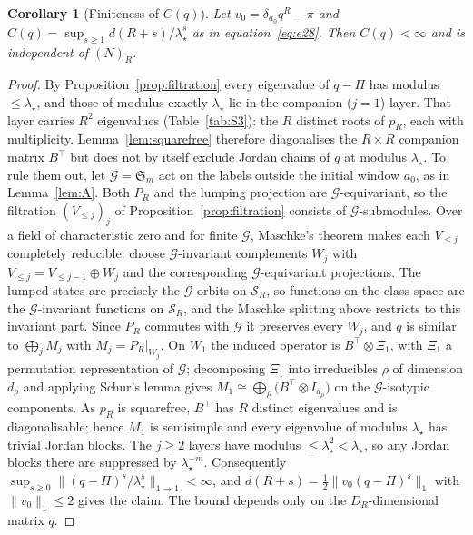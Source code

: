 \documentclass[twoside,11pt]{article}
\newtheorem{scor}[slemma]{Corollary}
\begin{document}
\begin{scor}[Finiteness of $C(q)$]\label{cor:Cfinite}
Let $v_0=\delta_{a_0}q^{R}-\pi$ and
$C(q)=\sup_{s\ge1}d(R+s)/\lambda_\star^{s}$ as in equation~\eqref{eq:e28}.
Then $C(q)<\infty$ and is independent of $(N)_R$.
\end{scor}

\begin{proof}
By Proposition~\ref{prop:filtration} every eigenvalue of $q-\Pi$ has modulus
$\le\lambda_\star$, and those of modulus exactly $\lambda_\star$ lie in the companion
($j=1$) layer. That layer carries $R^2$ eigenvalues (Table~\ref{tab:S3}):
the $R$ distinct roots of $p_R$, each with multiplicity. Lemma~\ref{lem:squarefree}
therefore diagonalises the $R\times R$ companion matrix $B^\top$ but does not
by itself exclude Jordan chains of $q$ at modulus $\lambda_\star$. To rule them out,
let $\mathcal{G}=\mathfrak{S}_{m}$ act on the labels outside the initial window $a_0$, as in Lemma~\ref{lem:A}. Both $P_R$ and
the lumping projection are $\mathcal{G}$-equivariant, so the filtration $(V_{\le j})_j$
of Proposition~\ref{prop:filtration} consists of $\mathcal{G}$-submodules. Over a field
of characteristic zero and for finite $\mathcal{G}$, Maschke's theorem makes each
$V_{\le j}$ completely reducible: choose $\mathcal{G}$-invariant complements $W_j$ with
$V_{\le j}=V_{\le j-1}\oplus W_j$ and the corresponding $\mathcal{G}$-equivariant
projections. The lumped states are precisely the $\mathcal{G}$-orbits on $\mathcal{S}_R$,
so functions on the class space are the $\mathcal{G}$-invariant functions on
$\mathcal{S}_R$, and the Maschke splitting above restricts to this invariant
part. Since $P_R$ commutes with $\mathcal{G}$ it preserves every $W_j$, and $q$
is similar to $\bigoplus_j M_j$ with $M_j=P_R|_{W_j}$. On $W_1$ the induced
operator is $B^\top\otimes\Xi_1$, with $\Xi_1$ a permutation representation
of $\mathcal{G}$; decomposing $\Xi_1$ into irreducibles $\rho$ of dimension
$d_\rho$ and applying Schur's lemma gives
$M_1\cong\bigoplus_\rho\bigl(B^\top\otimes I_{d_\rho}\bigr)$ on the
$\mathcal{G}$-isotypic components. As $p_R$ is squarefree, $B^\top$ has $R$ distinct
eigenvalues and is diagonalisable; hence $M_1$ is semisimple and every
eigenvalue of modulus $\lambda_\star$ has trivial Jordan blocks. The $j\ge2$ layers
have modulus $\le\lambda_\star^2<\lambda_\star$, so any Jordan blocks there are suppressed by
$\lambda_\star^{-m}$. Consequently
$\sup_{s\ge0}\|(q-\Pi)^{s}/\lambda_\star^{s}\|_{1\to1}<\infty$, and
$d(R+s)=\tfrac12\|v_0(q-\Pi)^{s}\|_{1}$ with $\|v_0\|_1\le2$ gives the claim.
The bound depends only on the $D_R$-dimensional matrix $q$.
\end{proof}
\end{document}
